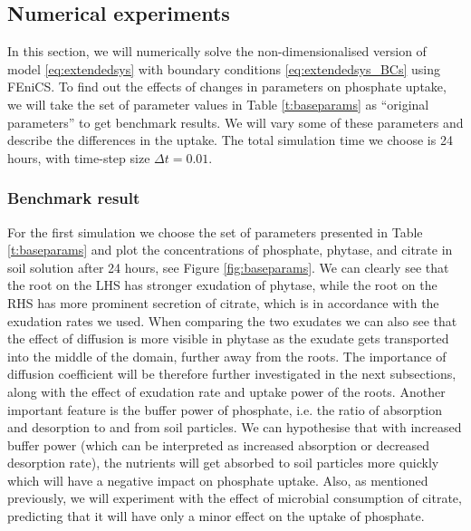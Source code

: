 \documentclass[11pt]{article}
\numberwithin{equation}{section}
\begin{document}
\subsection{Numerical experiments}
In this section, we will numerically solve the non-dimensionalised version of model \eqref{eq:extendedsys} with boundary conditions \eqref{eq:extendedsys_BCs} using FEniCS. To find out the effects of changes in parameters on phosphate uptake, we will take the set of parameter values in Table \ref{t:baseparams} as ``original parameters'' to get benchmark results. We will vary some of these parameters and describe the differences in the uptake. The total simulation time we choose is 24 hours, with time-step size $\Delta t = 0.01$.

\subsubsection{Benchmark result}
\label{sec:baseparams}
 For the first simulation we choose the set of parameters presented in Table \ref{t:baseparams} and plot the concentrations of phosphate, phytase, and citrate in soil solution after 24 hours, see Figure \ref{fig:baseparams}. We can clearly see that the root on the LHS has stronger exudation of phytase, while the root on the RHS has more prominent secretion of citrate, which is in accordance with the exudation rates we used. When comparing the two exudates we can also see that the effect of diffusion is more visible in phytase as the exudate gets transported into the middle of the domain, further away from the roots. The importance of diffusion coefficient will be therefore further investigated in the next subsections, along with the effect of exudation rate and uptake power of the roots. Another important feature is the buffer power of phosphate, i.e. the ratio of absorption and desorption to and from soil particles. We can hypothesise that with increased buffer power (which can be interpreted as increased absorption or decreased desorption rate), the nutrients will get absorbed to soil particles more quickly which will have a negative impact on phosphate uptake. Also, as mentioned previously, we will experiment with the effect of microbial consumption of citrate, predicting that it will have only a minor effect on the uptake of phosphate.
\end{document}
